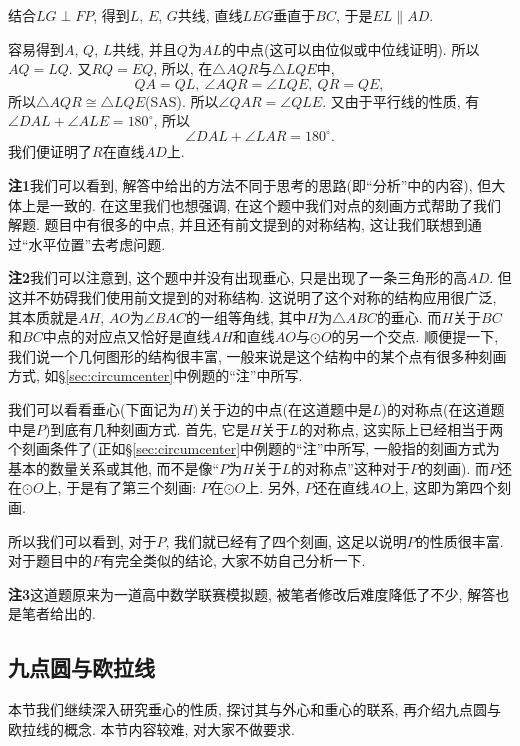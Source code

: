 \documentclass{book}
\begin{document}
\begin{paracol}{2}

\switchcolumn
结合$LG\perp FP$, 得到$L$, $E$, $G$共线, 直线$LEG$垂直于$BC$, 于是$EL\parallel AD$.\par
容易得到$A$, $Q$, $L$共线, 并且$Q$为$AL$的中点(这可以由位似或中位线证明). 所以$AQ=LQ$. 又$RQ=EQ$, 所以, 在$\triangle AQR$与$\triangle LQE$中,
\[QA=QL,\ \angle AQR=\angle LQE,\ QR=QE,\]
所以$\triangle AQR\cong\triangle LQE$(SAS). 所以$\angle QAR=\angle QLE$. 
\switchcolumn
又由于平行线的性质, 有$\angle DAL+\angle ALE=180^\circ$, 所以
\[\angle DAL+\angle LAR=180^\circ.\]
我们便证明了$R$在直线$AD$上.\par
\textbf{注1}\quad 我们可以看到, 解答中给出的方法不同于思考的思路(即“分析”中的内容), 但大体上是一致的. 在这里我们也想强调, 在这个题中我们对点的刻画方式帮助了我们解题. 题目中有很多的中点, 并且还有前文提到的对称结构, 这让我们联想到通过“水平位置”去考虑问题. \par
\textbf{注2}\quad 我们可以注意到, 这个题中并没有出现垂心, 只是出现了一条三角形的高$AD$. 但这并不妨碍我们使用前文提到的对称结构. 这说明了这个对称的结构应用很广泛, 其本质就是$AH$, $AO$为$\angle BAC$的一组等角线, 其中$H$为$\triangle ABC$的垂心. 而$H$关于$BC$和$BC$中点的对应点又恰好是直线$AH$和直线$AO$与$\odot O$的另一个交点. 顺便提一下, 我们说一个几何图形的结构很丰富, 一般来说是这个结构中的某个点有很多种刻画方式, 如\S\ref{sec:circumcenter}中例题的“注”中所写.\par
我们可以看看垂心(下面记为$H$)关于边的中点(在这道题中是$L$)的对称点(在这道题中是$P$)到底有几种刻画方式. 首先, 它是$H$关于$L$的对称点, 这实际上已经相当于两个刻画条件了(正如\S\ref{sec:circumcenter}中例题的“注”中所写, 一般指的刻画方式为基本的数量关系或其他, 而不是像“$P$为$H$关于$L$的对称点”这种对于$P$的刻画). 而$P$还在$\odot O$上, 于是有了第三个刻画: $P$在$\odot O$上. 另外, $P$还在直线$AO$上, 这即为第四个刻画.\par
所以我们可以看到, 对于$P$, 我们就已经有了四个刻画, 这足以说明$P$的性质很丰富. 对于题目中的$F$有完全类似的结论, 大家不妨自己分析一下.\par
\textbf{注3}\quad 这道题原来为一道高中数学联赛模拟题, 被笔者修改后难度降低了不少, 解答也是笔者给出的.

\subsection{九点圆与欧拉线}
本节我们继续深入研究垂心的性质, 探讨其与外心和重心的联系, 再介绍九点圆与欧拉线的概念. 本节内容较难, 对大家不做要求.\par


\end{paracol}
\end{document}
